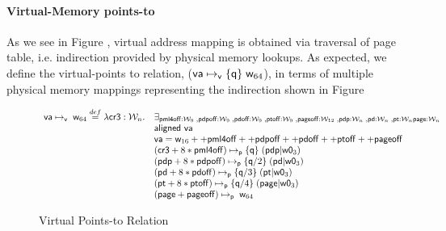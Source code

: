 \paragraph{Virtual-Memory points-to} As we see in Figure , virtual address mapping is obtained via traversal of page table, i.e. indirection provided by physical memory lookups. As expected, we define the virtual-points to relation, ($\mathsf{va}\mapsto_{\mathsf{v}}\{\mathsf{q}\}\;\mathsf{w}_{64}$), in terms of multiple physical memory mappings representing the indirection shown in Figure 
\begin{figure*}
\[
\begin{array}{cl}
  \mathsf{va}\mapsto_{\mathsf{v}}\;\mathsf{w}_{64} \stackrel{def}{=} \lambda \mathsf{cr3}:\mathcal{W}_n.
  & \exists_{\mathsf{pml4off}:\mathcal{W}_{9} \;, \mathsf{pdpoff}:\mathcal{W}_{9} \;, \mathsf{pdoff}:\mathcal{W}_{9} \;, \mathsf{ptoff}:\mathcal{W}_{9} \;, \mathsf{pageoff}:\mathcal{W}_{12} \;, \mathsf{pdp}:\mathcal{W}_n \;, \mathsf{pd}:\mathcal{W}_n \;, \mathsf{pt}:\mathcal{W}_n \mathsf{page}:\mathcal{W}_n}\\
  & \textsf{aligned } \mathsf{va} \\
  & \mathsf{va} = \mathsf{w}_{16} ++ \mathsf{pml4off} ++ \mathsf{pdpoff} ++ \mathsf{pdoff} ++ \mathsf{ptoff} ++ \mathsf{pageoff} \\
  &  (\mathsf{cr3}+8*\mathsf{pml4off})\mapsto_{\mathsf{p}}\{\mathsf{q}\}\;(\mathsf{pdp} | \mathsf{w0}_{3}) \\
  &  (\mathsf{pdp}+8*\mathsf{pdpoff})\mapsto_{\mathsf{p}}\{\mathsf{q}/2\}\;(\mathsf{pd} | \mathsf{w0}_{3}) \\
  & (\mathsf{pd}+8*\mathsf{pdoff})\mapsto_{\mathsf{p}}\{\mathsf{q}/3\}\;(\mathsf{pt} | \mathsf{w0}_{3}) \\
  & (\mathsf{pt}+8*\mathsf{ptoff})\mapsto_{\mathsf{p}}\{\mathsf{q}/4\}\;(\mathsf{page} | \mathsf{w0}_{3}) \\
  & (\mathsf{page}+\mathsf{pageoff})\mapsto_{\mathsf{p}}\;\mathsf{w}_{64} \\

\end{array}
\]
\caption{Virtual Points-to Relation}
  \label{fig:virtualpointsto}
\end{figure*}
